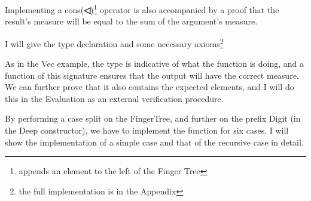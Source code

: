 \documentclass[12pt,twoside,notitlepage]{report}
\newcommand{\Conid}[1]{\mathit{#1}}
\newcommand{\Varid}[1]{\mathit{#1}}
\newcommand{\anonymous}{\kern0.06em \_}
\def\resethooks{%
  \global\let\SaveRestoreHook\empty
  \global\let\ColumnHook\empty}
\newcommand{\hsindent}[1]{\quad}%
\let\hspre\empty
\let\hspost\empty
\begin{document}
 
Implementing a cons(\textbf{◁})\footnote{appends an element to the left of the Finger Tree} operator is also accompanied by a proof that the result's measure will be equal to the sum of the argument's measure.

I will give the type declaration and some necessary axioms\footnote{the full implementation is in the Appendix}

\resethooks

As in the Vec example, the type is indicative of what the function is doing, and a function of this signature
ensures that the output will have the correct measure. We can further prove that it also contains the expected elements, and I will do this in the Evaluation as an external verification procedure.

By performing a case split on the FingerTree, and further on the prefix Digit (in the Deep constructor), we have to implement the function for six cases. I will show the implementation of a simple case and that of the recursive case in detail.
\end{document}
